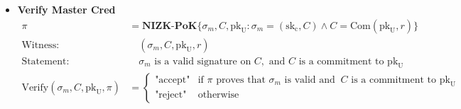 \begin{itemize}
\item \textbf{Verify Master Cred}
\begin{align*}
    \pi &= \textbf{NIZK-PoK}\{\sigma_{m}, C, \text{pk}_{\text{U}} : \sigma_{m} = (\text{sk}_{\text{c}}, C) \wedge C = \text{Com}(\text{pk}_{\text{U}}, r)\} \\
    \text{Witness:} &\quad (\sigma_{m}, C, \text{pk}_{\text{U}}, r) \\
    \text{Statement:} &\quad \sigma_{m} \text{ is a valid signature on } C, \text{ and } C \text{ is a commitment to } \text{pk}_{\text{U}} \\
    \text{Verify}(\sigma_{m}, C, \text{pk}_{\text{U}}, \pi) &= 
    \begin{cases}
        \text{"accept"} & \text{if } \pi \text{ proves that } \sigma_{m} \text{ is valid and } \ C \text{ is a commitment to } \text{pk}_{\text{U}} \\
        \text{"reject"} & \text{otherwise}
    \end{cases}
\end{align*}

\end{itemize}
